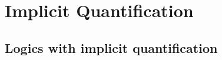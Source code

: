 \documentclass[11pt,a4paper,twoside]{book}
\newcommand\blankpage{%
    \null
    \thispagestyle{empty}%
    \addtocounter{page}{-1}%
    \newpage}
\begin{document}
    
    

    \printglossary[title=List of Abbreviations and Glossary] %

	


\mainmatter

\label{intro}





\chapter{Implicit Quantification}\label{problem}\label{semantics}

% 


\section{Logics with implicit quantification}



\label{ela}










%
\end{document}
